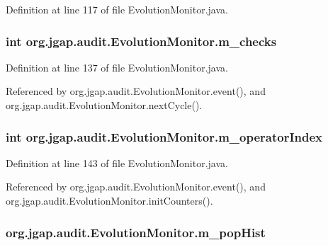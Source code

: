 Definition at line 117 of file Evolution\-Monitor.\-java.

\hypertarget{classorg_1_1jgap_1_1audit_1_1_evolution_monitor_aff60d0ebb1c8b61abd2d4161bf80e907}{
\subsubsection[{m\-\_\-checks}]{\setlength{\rightskip}{0pt plus 5cm}int org.\-jgap.\-audit.\-Evolution\-Monitor.\-m\-\_\-checks\hspace{0.3cm}{\ttfamily [private]}}}\label{classorg_1_1jgap_1_1audit_1_1_evolution_monitor_aff60d0ebb1c8b61abd2d4161bf80e907}


Definition at line 137 of file Evolution\-Monitor.\-java.



Referenced by org.\-jgap.\-audit.\-Evolution\-Monitor.\-event(), and org.\-jgap.\-audit.\-Evolution\-Monitor.\-next\-Cycle().

\hypertarget{classorg_1_1jgap_1_1audit_1_1_evolution_monitor_a8d6fb9bbfa6ef0f1347b952482518d2a}{
\subsubsection[{m\-\_\-operator\-Index}]{\setlength{\rightskip}{0pt plus 5cm}int org.\-jgap.\-audit.\-Evolution\-Monitor.\-m\-\_\-operator\-Index\hspace{0.3cm}{\ttfamily [private]}}}\label{classorg_1_1jgap_1_1audit_1_1_evolution_monitor_a8d6fb9bbfa6ef0f1347b952482518d2a}


Definition at line 143 of file Evolution\-Monitor.\-java.



Referenced by org.\-jgap.\-audit.\-Evolution\-Monitor.\-event(), and org.\-jgap.\-audit.\-Evolution\-Monitor.\-init\-Counters().

\hypertarget{classorg_1_1jgap_1_1audit_1_1_evolution_monitor_a909b9c70b78843ab34ab1f98cc19dd8c}{
\subsubsection[{m\-\_\-pop\-Hist}]{ org.\-jgap.\-audit.\-Evolution\-Monitor.\-m\-\_\-pop\-Hist\hspace{0.3cm}{\ttfamily [private]}}}\label{classorg_1_1jgap_1_1audit_1_1_evolution_monitor_a909b9c70b78843ab34ab1f98cc19dd8c}


